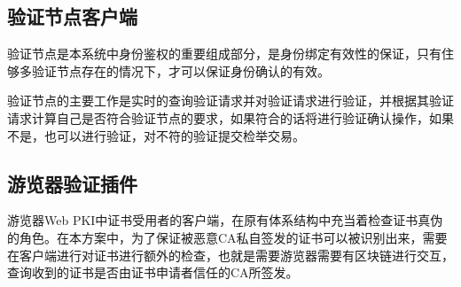 \subsection{验证节点客户端}

验证节点是本系统中身份鉴权的重要组成部分，是身份绑定有效性的保证，只有住够多验证节点存在的情况下，才可以保证身份确认的有效。

验证节点的主要工作是实时的查询验证请求并对验证请求进行验证，并根据其验证请求计算自己是否符合验证节点的要求，如果符合的话将进行验证确认操作，如果不是，也可以进行验证，对不符的验证提交检举交易。


\subsection{游览器验证插件}


游览器Web PKI中证书受用者的客户端，在原有体系结构中充当着检查证书真伪的角色。在本方案中，为了保证被恶意CA私自签发的证书可以被识别出来，需要在客户端进行对证书进行额外的检查，也就是需要游览器需要有区块链进行交互，查询收到的证书是否由证书申请者信任的CA所签发。


